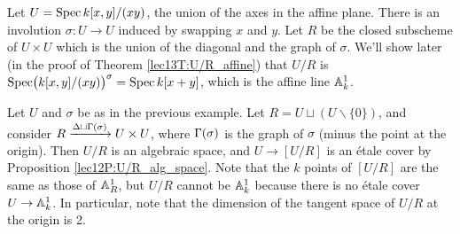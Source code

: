  \begin{example}
   Let $U=\spec k[x,y]/(xy)$, the union of the axes in the affine plane. There is an
   involution $\sigma:U\to U$ induced by swapping $x$ and $y$. Let $R$ be the closed
   subscheme of $U\times U$ which is the union of the diagonal and the graph of $\sigma$.
   We'll show later (in the proof of Theorem \ref{lec13T:U/R_affine}) that $U/R$ is $\spec
   \bigl(k[x,y]/(xy)\bigr)^\sigma = \spec k[x+y]$, which is the affine line $\AA^1_k$.
 \end{example}
 \begin{example}
   Let $U$ and $\sigma$ be as in the previous example. Let $R=U\sqcup
   (U\smallsetminus\{0\})$, and consider $R\xrightarrow{\Delta\sqcup \Ga(\sigma)} U\times
   U$, where $\Ga(\sigma)$ is the graph of $\sigma$ (minus the point at the origin). Then
   $U/R$ is an algebraic space, and $U\to [U/R]$ is an \'etale cover by Proposition
   \ref{lec12P:U/R_alg_space}. Note that the $k$ points of $[U/R]$ are the same as those
   of $\AA^1_R$, but $U/R$ cannot be $\AA^1_k$ because there is no \'etale cover $U\to
   \AA^1_k$. In particular, note that the dimension of the tangent space of $U/R$ at
   the origin is 2.
 \end{example}

